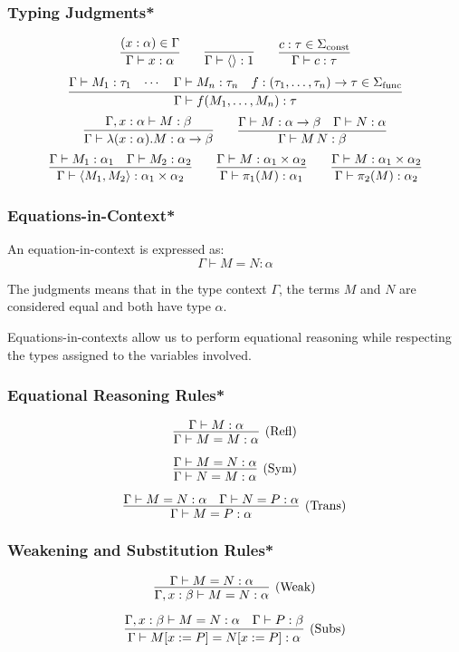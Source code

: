 \documentclass[aspectratio=169]{beamer}
\begin{document}
\begin{frame}
\frametitle{Typing Judgments*}

\[
\infer{\Gamma \vdash x : \alpha}{(x : \alpha) \in \Gamma}
\qquad
\infer{\Gamma \vdash \langle \rangle : 1}{}
\qquad
\infer{\Gamma \vdash c : \tau}{c : \tau \in \Sigma_{\text{const}}}
\]
\pause
\[
\infer{\Gamma \vdash f(M_1, \ldots, M_n) : \tau}{\Gamma \vdash M_1 : \tau_1 & \cdots & \Gamma \vdash M_n : \tau_n & f : (\tau_1, \ldots, \tau_n) \rightarrow \tau \in \Sigma_{\text{func}}}
\]
\pause
\[
\infer{\Gamma \vdash \lambda (x : \alpha). M : \alpha \rightarrow \beta}{\Gamma, x : \alpha \vdash M : \beta}
\qquad
\infer{\Gamma \vdash M \, N : \beta}{\Gamma \vdash M : \alpha \rightarrow \beta & \Gamma \vdash N : \alpha}
\]
\pause
\[
\infer{\Gamma \vdash \langle M_1, M_2 \rangle : \alpha_1 \times \alpha_2}{\Gamma \vdash M_1 : \alpha_1 & \Gamma \vdash M_2 : \alpha_2}
\qquad
\infer{\Gamma \vdash \pi_1(M) : \alpha_1}{\Gamma \vdash M : \alpha_1 \times \alpha_2}
\qquad
\infer{\Gamma \vdash \pi_2(M) : \alpha_2}{\Gamma \vdash M : \alpha_1 \times \alpha_2}
\]
\end{frame}

\begin{frame}
\frametitle{Equations-in-Context*}

An equation-in-context is expressed as:
\[
\Gamma \vdash M = N : \alpha
\]

The judgments means that in the type context $\Gamma$, the terms $M$ and $N$ are considered equal and both have type $\alpha$.

\medskip

Equations-in-contexts allow us to perform equational reasoning while respecting the types assigned to the variables involved.

\end{frame}

\begin{frame}
\frametitle{Equational Reasoning Rules*}

\[
\infer[\text{(Refl)}]{\Gamma \vdash M = M : \alpha}{\Gamma \vdash M : \alpha}
\]

\[
\infer[\text{(Sym)}]{\Gamma \vdash N = M : \alpha}{\Gamma \vdash M = N : \alpha}
\]

\[
\infer[\text{(Trans)}]{\Gamma \vdash M = P : \alpha}{\Gamma \vdash M = N : \alpha & \Gamma \vdash N = P : \alpha}
\]
\end{frame}

\begin{frame}
\frametitle{Weakening and Substitution Rules*}

\[
\infer[\text{(Weak)}]{\Gamma, x : \beta \vdash M = N : \alpha}{\Gamma \vdash M = N : \alpha}
\]

\[
\infer[\text{(Subs)}]{\Gamma \vdash M[x := P] = N[x := P] : \alpha}{\Gamma, x : \beta \vdash M = N : \alpha & \Gamma \vdash P : \beta}
\]
\end{frame}
\end{document}
